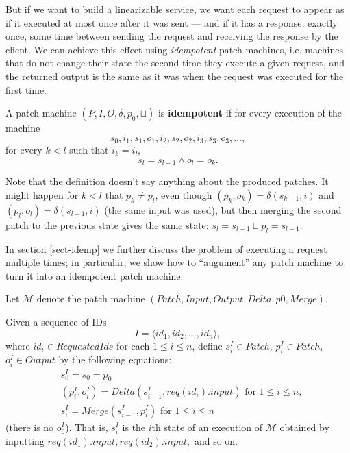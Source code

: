 \documentclass[12pt,a4paper,en]{pracamgr}
\newcommand{\tb}[1]{\textbf{#1}}
\newcommand{\ti}[1]{\textit{#1}}
\newcommand{\mc}[1]{\mathcal{#1}}
\begin{document}
But if we want to build a linearizable service, we want each request to appear as if it executed at most once after it was sent --- and if it has a response, exactly once, some time between sending the request and receiving the response by the client. We can achieve this effect using \ti{idempotent} patch machines, i.e. machines that do not change their state the second time they execute a given request, and the returned output is the same as it was when the request was executed for the first time.

\begin{defin}
    A patch machine $(P, I, O, \delta, p_0, \sqcup)$ is \tb{idempotent} if for every execution of the machine
    $$ s_0, i_1, s_1, o_1, i_2, s_2, o_2, i_3, s_3, o_3, \dots, $$
    for every $k < l$ such that $i_k = i_l$,
    $$ s_l = s_{l-1} \land o_l = o_k. $$
\end{defin}

Note that the definition doesn't say anything about the produced patches. It might happen for $k < l$ that $p_k \neq p_l$, even though $(p_k, o_k) = \delta(s_{k-1}, i)$ and $(p_l, o_l) = \delta(s_{l-1}, i)$ (the same input was used), but then merging the second patch to the previous state gives the same state: $s_l = s_{l-1} \sqcup p_l = s_{l-1}$.

In section \ref{sect-idemp} we further discuss the problem of executing a request multiple times; in particular, we show how to ``augument'' any patch machine to turn it into an idempotent patch machine.

Let $\mc M$ denote the patch machine $(Patch, Input, Output, Delta, p0, Merge)$.

Given a sequence of IDs
$$ I = \langle id_1, id_2, \dots, id_n\rangle , $$
where $id_i \in RequestedIds$ for each $1 \le i \le n$, define $s_i^I \in Patch$, $p_i^I \in Patch$, $o_i^I \in Output$ by the following equations:
\begin{align*}
    & s_0^I = s_0 = p_0\\
    & (p_i^I, o_i^I) = Delta(s_{i-1}^I, req(id_i).input) \text{ for } 1 \le i \le n,\\
    & s_i^I = Merge(s_{i-1}^I, p_i^I) \text{ for } 1 \le i \le n
\end{align*}
(there is no $o_0^I$). That is, $s_i^I$ is the $i$th state of an execution of $\mc M$ obtained by inputting $req(id_1).input, req(id_2).input,$ and so on.
\end{document}
